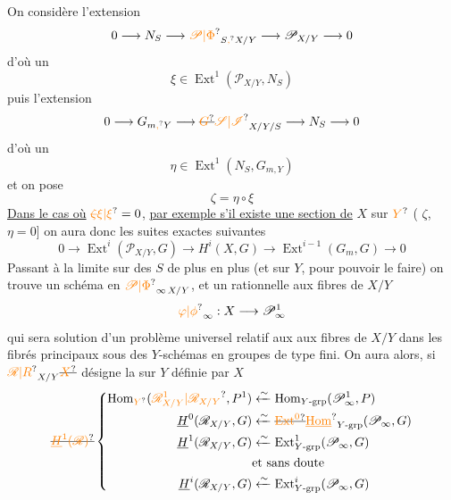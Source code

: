 On considère l'extension
\[
0\longrightarrow N_S\longrightarrow{\unsure{\mathscr{P}|\Phi}}_{S{\unsure{,}}X/Y}\longrightarrow\mathscr{P}_{X/Y}\longrightarrow 0
\]
d'où un
\[
\xi\in\operatorname{Ext}^1(\mathscr{P}_{X/Y},N_S)
\]
puis l'extension
\[
0\longrightarrow G_{m{\unsure{,}}Y}\longrightarrow\deleted{{\unsure{G}}}{\unsure{\mathscr{S}|\mathscr{I}}}_{X/Y/S}\longrightarrow N_S\longrightarrow 0
\]
d'où un
\[
\eta\in\operatorname{Ext}^1(N_S,G_{m,Y})
\]
et on pose
\[
\zeta=\eta\circ\xi
\]
\uline{Dans le cas où} ${\unsure{\deleted{\zeta}\xi|\xi}}=0$, \uline{par exemple s'il existe une section de} $X$ sur ${\unsure{Y}}$ ({} {} $\zeta$, {} $\eta=0$] on aura donc les suites exactes {} suivantes
\[
\boxed{0\longrightarrow\operatorname{Ext}^i(\mathscr{P}_{X/Y},G)\longrightarrow H^i(X,G)\longrightarrow\operatorname{Ext}^{i-1}(G_m,G)\longrightarrow0}
\]
Passant à la limite sur des $S$ de plus en plus {} (et {} sur $Y$, pour pouvoir le faire) on trouve un schéma en {} ${\unsure{\mathscr{P}|\Phi}}_{\infty\,X/Y}$,  et un  rationnelle {} aux fibres de $X/Y$
\[
{\unsure{\varphi|\phi}}_\infty:X\longrightarrow\mathscr{P}_\infty^1
\]
qui sera solution d'un problème universel relatif aux {} {} aux fibres de $X/Y$ dans les fibrés principaux sous des $Y$-schémas en groupes  de type fini. On aura alors, si ${\unsure{\mathscr{R}|R}}_{X/Y}\deleted{{\unsure{X}}}$ désigne la \uline{{}} sur $Y$ définie par $X$
\[
\deleted{{\unsure{\underline{H}^1(\mathscr{R})}}}
\left\{\begin{aligned}
\operatorname{Hom}_{{\unsure{Y}}}({\unsure{\mathscr{R}_{X/Y}^1|\mathscr{R}_{X/Y}}},P^1)&\xleftarrow{\sim}\operatorname{Hom}_{Y\text{-}\mathrm{grp}}(\mathscr{P}_\infty^1,P)\\
\underline{H}^0(\mathscr{R}_{X/Y},G)&\xleftarrow{\sim}\deleted{{\unsure{\operatorname{Ext}^0}}}{\unsure{\underline{\operatorname{Hom}}}}_{Y\text{-}\mathrm{grp}}(\mathscr{P}_\infty,G)\\
\underline{H}^1(\mathscr{R}_{X/Y},G)&\xleftarrow{\sim}\operatorname{Ext}^1_{Y\text{-}\mathrm{grp}}(\mathscr{P}_\infty,G)\\
&\text{et sans doute}\\
\underline{H}^i(\mathscr{R}_{X/Y},G)&\xleftarrow{\sim}\operatorname{Ext}^i_{Y\text{-}\mathrm{grp}}(\mathscr{P}_\infty,G)
\end{aligned}\right.
\]

